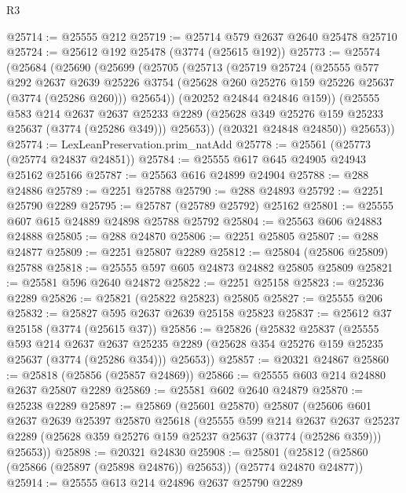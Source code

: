 \begin{lexlean}{R3}
\begin{coremodule}
@25714 := @25555 @212
@25719 := @25714 @579 @2637 @2640 @25478 @25710
@25724 := @25612 @192 @25478 (@3774 (@25615 @192))
@25773 := @25574
    (@25684
      (@25690
        (@25699
          (@25705
            (@25713
              (@25719
                @25724
                (@25555
                  @577
                  @292
                  @2637
                  @2639
                  @25226
                  @3754
                  (@25628 @260 @25276 @159 @25226 @25637 (@3774 (@25286 @260)))
                  @25654))
              (@20252 @24844 @24846 @159))
            (@25555
              @583
              @214
              @2637
              @2637
              @25233
              @2289
              (@25628 @349 @25276 @159 @25233 @25637 (@3774 (@25286 @349)))
              @25653))
          (@20321 @24848 @24850))
        @25653))
@25774 := LexLeanPreservation.prim_natAdd
@25778 := @25561 (@25773 (@25774 @24837 @24851))
@25784 := @25555 @617 @645 @24905 @24943 @25162 @25166
@25787 := @25563 @616 @24899 @24904
@25788 := @288 @24886
@25789 := @2251 @25788
@25790 := @288 @24893
@25792 := @2251 @25790 @2289
@25795 := @25787 (@25789 @25792) @25162
@25801 := @25555 @607 @615 @24889 @24898 @25788 @25792
@25804 := @25563 @606 @24883 @24888
@25805 := @288 @24870
@25806 := @2251 @25805
@25807 := @288 @24877
@25809 := @2251 @25807 @2289
@25812 := @25804 (@25806 @25809) @25788
@25818 := @25555 @597 @605 @24873 @24882 @25805 @25809
@25821 := @25581 @596 @2640 @24872
@25822 := @2251 @25158
@25823 := @25236 @2289
@25826 := @25821 (@25822 @25823) @25805
@25827 := @25555 @206
@25832 := @25827 @595 @2637 @2639 @25158 @25823
@25837 := @25612 @37 @25158 (@3774 (@25615 @37))
@25856 := @25826
    (@25832
      @25837
      (@25555
        @593
        @214
        @2637
        @2637
        @25235
        @2289
        (@25628 @354 @25276 @159 @25235 @25637 (@3774 (@25286 @354)))
        @25653))
@25857 := @20321 @24867
@25860 := @25818 (@25856 (@25857 @24869))
@25866 := @25555 @603 @214 @24880 @2637 @25807 @2289
@25869 := @25581 @602 @2640 @24879
@25870 := @25238 @2289
@25897 := @25869
    (@25601 @25870)
    @25807
    (@25606
      @601
      @2637
      @2639
      @25397
      @25870
      @25618
      (@25555
        @599
        @214
        @2637
        @2637
        @25237
        @2289
        (@25628 @359 @25276 @159 @25237 @25637 (@3774 (@25286 @359)))
        @25653))
@25898 := @20321 @24830
@25908 := @25801 (@25812 (@25860 (@25866 (@25897 (@25898 @24876)) @25653)) (@25774 @24870 @24877))
@25914 := @25555 @613 @214 @24896 @2637 @25790 @2289

\end{coremodule}
\end{lexlean}
